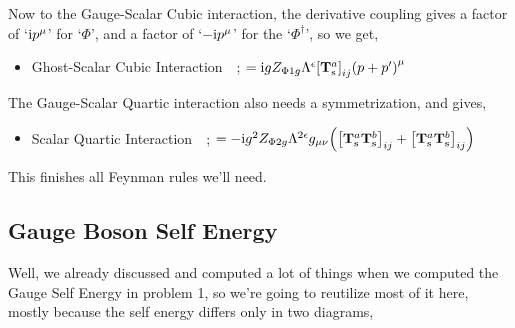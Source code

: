 Now to the Gauge-Scalar Cubic interaction, the derivative coupling gives a factor of `$\textnormal{i} p^\mu$' for `$\Phi$', 
and a factor of `$-\textnormal{i} p^\mu$' for the `$\Phi^\dagger$', so we get,

\begin{itemize}
    \item Ghost-Scalar Cubic Interaction\ \ ; $=\textnormal{i} g Z_{\Phi1g}\Lambda^{\epsilon}\qty[\vb T^a_{\textnormal{s}}]_{ij}\qty(p+p')^\mu$
\end{itemize}

The Gauge-Scalar Quartic interaction also needs a symmetrization, and gives,

\begin{itemize}
    \item Scalar Quartic Interaction\ \ ; $=-\textnormal{i} g^2Z_{\Phi2g}\Lambda^{2\epsilon}g_{\mu\nu}\qty(\qty[\vb T^a_{\textnormal{s}}\vb T^b_{\textnormal{s}}]_{ij}+\qty[\vb T^a_{\textnormal{s}}\vb T^b_{\textnormal{s}}]_{ij})$
\end{itemize}

This finishes all Feynman rules we'll need.

\subsection{Gauge Boson Self Energy}

Well, we already discussed and computed a lot of things when we computed the Gauge Self Energy in problem 1, 
so we're going to reutilize most of it here, mostly because the self energy differs only in two diagrams,

